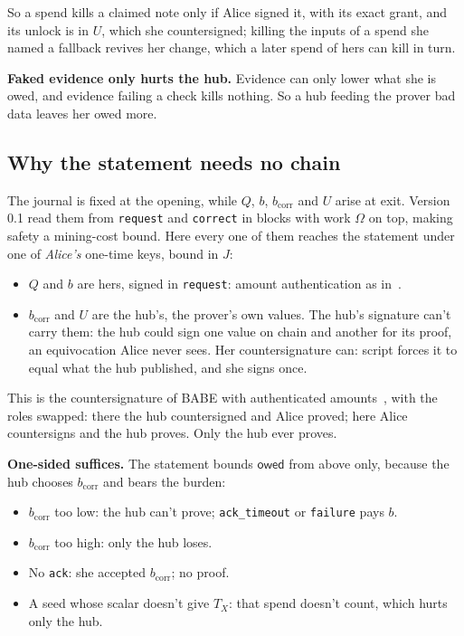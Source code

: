 \documentclass[11pt]{article}
\theoremstyle{plain}
\theoremstyle{definition}
\newcommand{\bcorr}{b_{\mathrm{corr}}}
\newcommand{\tx}[1]{\texttt{#1}}
\newcommand{\owed}{\mathsf{owed}}
\begin{document}
So a spend kills a claimed note only if Alice signed it, with its exact
grant, and its unlock is in $U$, which she countersigned; killing the
inputs of a spend she named a fallback revives her change, which a later
spend of hers can kill in turn.

\textbf{Faked evidence only hurts the hub.} Evidence can only lower what
she is owed, and evidence failing a check kills nothing. So a hub
feeding the prover bad data leaves her owed more.

\subsection{Why the statement needs no chain}\label{sec:nochain}

The journal is fixed at the opening, while $Q$, $b$, $\bcorr$ and $U$
arise at exit. Version 0.1 read them from \tx{request} and \tx{correct}
in blocks with work $\Omega$ on top, making safety a mining-cost bound.
Here every one of them reaches the statement under one of \emph{Alice's}
one-time keys, bound in $J$:
\begin{itemize}[nosep]
\item $Q$ and $b$ are hers, signed in \tx{request}: amount
  authentication as in~\cite{lichen}.
\item $\bcorr$ and $U$ are the hub's, the prover's own values. The
  hub's signature can't carry them: the hub could sign one value on
  chain and another for its proof, an equivocation Alice never sees.
  Her countersignature can: script forces it to equal what the hub
  published, and she signs once.
\end{itemize}
This is the countersignature of BABE with authenticated
amounts~\cite{lichen,delving}, with the roles swapped: there the hub
countersigned and Alice proved; here Alice countersigns and the hub
proves. Only the hub ever proves.

\textbf{One-sided suffices.} The statement bounds $\owed$ from above
only, because the hub chooses $\bcorr$ and bears the burden:
\begin{itemize}[nosep]
\item $\bcorr$ too low: the hub can't prove; \tx{ack\_timeout} or
  \tx{failure} pays $b$.
\item $\bcorr$ too high: only the hub loses.
\item No \tx{ack}: she accepted $\bcorr$; no proof.
\item A seed whose scalar doesn't give $T_X$: that spend doesn't count,
  which hurts only the hub.
\end{itemize}
\end{document}

